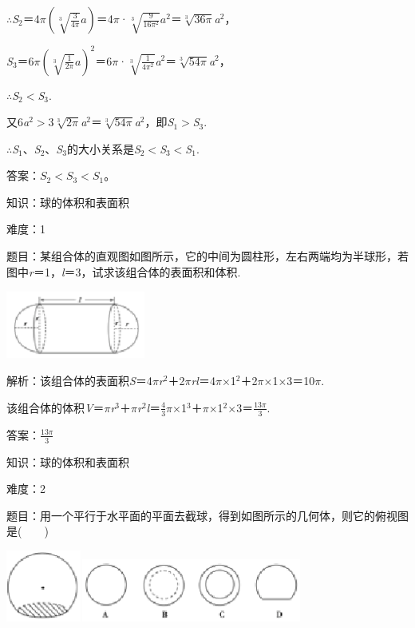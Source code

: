 \documentclass{article} %
\begin{document}
$\mathrm{\therefore}$\textit{S}${}_{2}$＝4$\pi(\sqrt[3]{\frac{3}{4\pi}}a)$＝4$\pi$·$\sqrt[3]{\frac{9}{16\pi^2}}a^2$＝$\sqrt[3]{36\pi}$\textit{a}${}^{2}$，

\textit{S}${}_{3}$＝6$\pi(\sqrt[3]{\frac{1}{2\pi}}a)^2$＝6$\pi$·$\sqrt[3]{\frac{1}{4\pi^2}}$\textit{a}${}^{2}$＝$\sqrt[3]{54\pi}$\textit{a}${}^{2}$，

$\mathrm{\therefore}$\textit{S}${}_{2}$$\mathrm{<}$\textit{S}${}_{3}$.

又6\textit{a}${}^{2}$$\mathrm{>}$3$\sqrt[3]{2\pi}$\textit{a}${}^{2}$＝$\sqrt[3]{54\pi}$\textit{a}${}^{2}$，即\textit{S}${}_{1}$$\mathrm{>}$\textit{S}${}_{3}$.

$\mathrm{\therefore}$\textit{S}${}_{1}$、\textit{S}${}_{2}$、\textit{S}${}_{3}$的大小关系是\textit{S}${}_{2}$$\mathrm{<}$\textit{S}${}_{3}$$\mathrm{<}$\textit{S}${}_{1}$.

答案：$S_2<S_3<S_1$。

知识：球的体积和表面积

难度：1

题目：某组合体的直观图如图所示，它的中间为圆柱形，左右两端均为半球形，若图中\textit{r}＝1，\textit{l}＝3，试求该组合体的表面积和体积.

\includegraphics*[width=1.80in, height=0.88in, keepaspectratio=false]{image77}

解析：该组合体的表面积\textit{S}＝4$\pi$\textit{r}${}^{2}$＋2$\pi$\textit{rl}＝4$\pi$$\mathrm{\times}$1${}^{2}$＋2$\pi$$\mathrm{\times}$1$\mathrm{\times}$3＝10$\pi$.

该组合体的体积\textit{V}＝$\pi$\textit{r}${}^{3}$＋$\pi$\textit{r}${}^{2}$\textit{l}＝$\frac{4}{3}\pi$$\mathrm{\times}$1${}^{3}$＋$\pi$$\mathrm{\times}$1${}^{2}$$\mathrm{\times}$3＝$\frac{13\pi}{3}$.

答案：$\frac{13\pi}{3}$

知识：球的体积和表面积

难度：2

题目：用一个平行于水平面的平面去截球，得到如图所示的几何体，则它的俯视图是(　　)

\includegraphics*[width=0.97in, height=0.93in, keepaspectratio=false]{image78}\includegraphics*[width=2.88in, height=0.81in, keepaspectratio=false]{image79}
\end{document}
